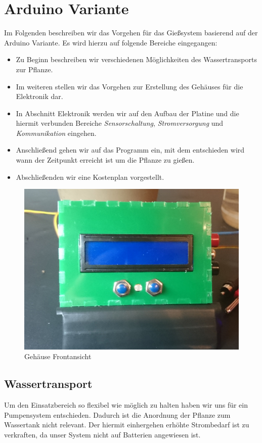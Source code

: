 
\section{Arduino Variante}
Im Folgenden beschreiben wir das Vorgehen für das Gießsystem basierend auf der Arduino Variante. 
Es wird hierzu auf folgende Bereiche eingegangen:

\begin{itemize}
	\item Zu Beginn beschreiben wir verschiedenen Möglichkeiten des Wassertransports zur Pflanze.
	\item Im weiteren stellen wir das Vorgehen zur Erstellung des Gehäuses für die Elektronik dar.
	\item In Abschnitt Elektronik werden wir auf den Aufbau der Platine und die hiermit verbunden Bereiche \emph{Sensorschaltung}, \emph{Stromversorgung} und \emph{Kommunikation} eingehen.
	\item Anschließend gehen wir auf das Programm ein, mit dem entschieden wird wann der Zeitpunkt erreicht ist um die Pflanze zu gießen.
	\item Abschließenden wir eine Kostenplan vorgestellt. 
	
\end{itemize}
	\begin{figure}[!h]
	\includegraphics[width=0.8\linewidth]{bilder/_boxFron1.jpg}	
	\caption{Gehäuse Frontansicht}
	\label{fig-Gehäuse}
	\end{figure}

\subsection{Wassertransport}
Um den Einsatzbereich so flexibel wie möglich zu halten haben wir uns für ein Pumpensystem entschieden. 
Dadurch ist die Anordnung der Pflanze zum Wassertank nicht relevant. 
Der hiermit einhergehen erhöhte Strombedarf ist zu verkraften, da unser System nicht auf Batterien angewiesen ist.

